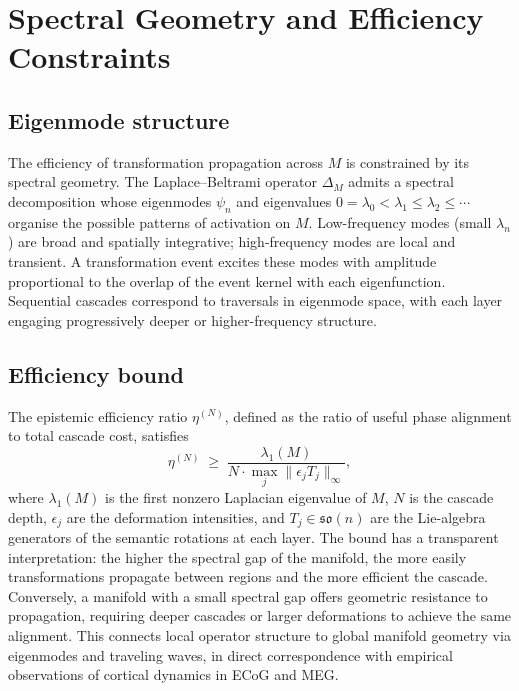 \documentclass[12pt, a4paper]{article}
\theoremstyle{remark}
\theoremstyle{definition}
\begin{document}
\section{Spectral Geometry and Efficiency Constraints}
\label{sec:spectral}

\subsection{Eigenmode structure}

The efficiency of transformation propagation across $M$ is constrained by its spectral
geometry.  The Laplace--Beltrami operator $\Delta_M$ admits a spectral decomposition whose
eigenmodes $\psi_n$ and eigenvalues $0 = \lambda_0 < \lambda_1 \le \lambda_2 \le \cdots$
organise the possible patterns of activation on $M$.  Low-frequency modes (small
$\lambda_n$) are broad and spatially integrative; high-frequency modes are local and
transient.  A transformation event excites these modes with amplitude proportional to the
overlap of the event kernel with each eigenfunction.  Sequential cascades correspond to
traversals in eigenmode space, with each layer engaging progressively deeper or
higher-frequency structure.

\subsection{Efficiency bound}

The epistemic efficiency ratio $\eta^{(N)}$, defined as the ratio of useful phase alignment
to total cascade cost, satisfies
\begin{equation}
  \eta^{(N)} \;\geq\;
  \frac{\lambda_1(M)}{N \cdot \max_j \|\epsilon_j T_j\|_\infty},
  \label{eq:efficiency}
\end{equation}
where $\lambda_1(M)$ is the first nonzero Laplacian eigenvalue of $M$, $N$ is the cascade
depth, $\epsilon_j$ are the deformation intensities, and $T_j \in \mathfrak{so}(n)$ are
the Lie-algebra generators of the semantic rotations at each layer.  The bound has a
transparent interpretation: the higher the spectral gap of the manifold, the more easily
transformations propagate between regions and the more efficient the cascade.  Conversely,
a manifold with a small spectral gap offers geometric resistance to propagation, requiring
deeper cascades or larger deformations to achieve the same alignment.  This connects local
operator structure to global manifold geometry via eigenmodes and traveling waves, in
direct correspondence with empirical observations of cortical dynamics in ECoG and MEG.
\end{document}
